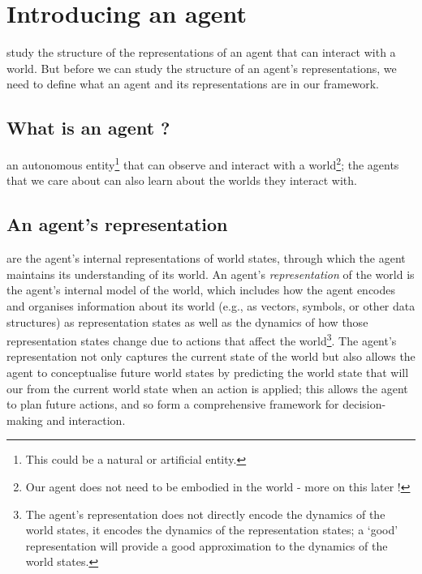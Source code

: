 \section{Introducing an agent}

 study the structure of the representations of an agent that can interact with a world.
But before we can study the structure of an agent's representations, we need to define what an agent and its representations are in our framework.


\subsection{What is an agent ?}

 an autonomous entity\footnote{
    This could be a natural or artificial entity.
} that can observe and interact with a world\footnote{
    Our agent does not need to be embodied in the world - more on this later !
}; the agents that we care about can also learn about the worlds they interact with.

\subsection{An agent's representation}

 are the agent's internal representations of world states, through which the agent maintains its understanding of its world.
An agent's \emph{representation} of the world is the agent's internal model of the world, which includes how the agent encodes and organises information about its world (e.g., as vectors, symbols, or other data structures) as representation states as well as the dynamics of how those representation states change due to actions that affect the world\footnote{
    The agent's representation does not directly encode the dynamics of the world states, it encodes the dynamics of the representation states; a `good' representation will provide a good approximation to the dynamics of the world states.
}.
The agent's representation not only captures the current state of the world but also allows the agent to conceptualise future world states by predicting the world state that will our from the current world state when an action is applied; this allows the agent to plan future actions, and so form a comprehensive framework for decision-making and interaction.

